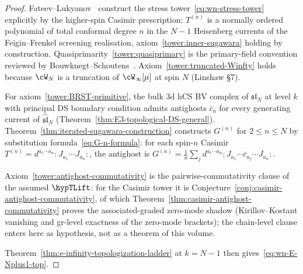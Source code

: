 \begin{proof}
Fateev--Lukyanov~\cite{Fateev-Lukyanov} construct the stress
tower~\eqref{eq:wn-stress-tower} explicitly by the higher-spin Casimir
prescription: $T^{(n)}$ is a normally ordered polynomial of total
conformal degree $n$ in the $N-1$ Heisenberg currents of the
Feigin--Frenkel screening realisation,
axiom~\ref{tower:inner-sugawara} holding by construction.
Quasiprimarity~\ref{tower:quasiprimary} is the primary-field
convention reviewed by Bouwknegt--Schoutens~\cite{BMP-Wsymmetry}.
Axiom~\ref{tower:truncated-Winfty} holds because $\cW_N$ is a
truncation of $\cW_\infty[\mu]$ at spin $N$
\textup{(}Linshaw\,\cite{Linshaw-Winfty}\,§7\textup{)}.

For axiom~\ref{tower:BRST-primitive}, the bulk $3$d hCS BV complex of
$\mathfrak{sl}_N$ at level $k$ with principal DS boundary condition
admits antighosts $\bar c_{a}$ for every generating current of
$\widehat{\mathfrak{sl}}_N$
\textup{(}Theorem~\textup{\ref{thm:E3-topological-DS-general}}\textup{)}.
Theorem~\ref{thm:iterated-sugawara-construction} constructs
$G^{(n)}$ for $2 \le n \le N$ by substitution
formula~\eqref{eq:G-n-formula}: for each spin-$n$ Casimir
$T^{(n)} = d^{a_1\cdots a_n}{:}J_{a_1}\cdots J_{a_n}{:}$, the antighost
is $G^{(n)} = \tfrac{1}{n}\sum_j d^{a_1\cdots a_n}
{:}J_{a_1}\cdots \bar c_{a_j}\cdots J_{a_n}{:}$.

Axiom~\ref{tower:antighost-commutativity} is the
pairwise-commutativity clause of the assumed \(\hypTLift\): for the
Casimir tower it is
Conjecture~\ref{conj:casimir-antighost-commutativity}, of which
Theorem~\ref{thm:casimir-antighost-commutativity} proves the
associated-graded zero-mode shadow (Kirillov--Kostant vanishing and
gr-level exactness of the zero-mode brackets); the chain-level
clause enters here as hypothesis, not as a theorem of this volume.

Theorem~\ref{thm:e-infinity-topologization-ladder} at $k = N - 1$ then
gives~\eqref{eq:wn-E-Nplus1-top}.
\end{proof}

